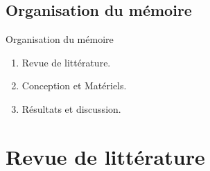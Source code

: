 \documentclass[11pt,handout]{beamer}
\begin{document}
		\subsection{Organisation du mémoire}
			\begin{frame}
			      \begin{block}{Organisation du mémoire}
			      \begin{enumerate}
			       \item Revue de littérature.
			       \item Conception et Matériels.
			       \item Résultats et discussion.
			      \end{enumerate}
			      \end{block}
			\end{frame}
	\section{Revue de littérature}
\end{document}

